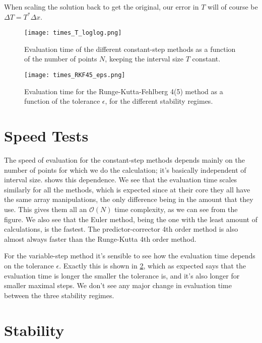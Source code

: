 \documentclass[10pt,a4paper,twocolumn]{article}
\begin{document}
When scaling the solution back to get the original, our error in $T$ will of course be $\Delta T = T^* \Delta x$.

\begin{figure}
    \centering
    \captionsetup{justification=centering}
    \texttt{[image: times\_T\_loglog.png]}
    \caption{Evaluation time of the different constant-step methods as a function of the number of points $N$, keeping the interval size $T$ constant.}
    \label{fig:times_T}
\end{figure}

\begin{figure}
    \centering
    \captionsetup{justification=centering}
    \texttt{[image: times\_RKF45\_eps.png]}
    \caption{Evaluation time for the Runge-Kutta-Fehlberg 4(5) method as a function of the tolerance $\epsilon$, for the different stability regimes.}
    \label{fig:times_RKF45}
\end{figure}

\section{Speed Tests}

The speed of evaluation for the constant-step methods depends mainly on the number of points for which we do the calculation; it's basically independent of interval size.  shows this dependence. We see that the evaluation time scales similarly for all the methods, which is expected since at their core they all have the same array manipulations, the only difference being in the amount that they use. This gives them all an $\mathcal{O}(N)$ time complexity, as we can see from the figure. We also see that the Euler method, being the one with the least amount of calculations, is the fastest. The predictor-corrector 4th order method is also almost always faster than the Runge-Kutta 4th order method.

For the variable-step method it's sensible to see how the evaluation time depends on the tolerance $\epsilon$. Exactly this is shown in \cref{fig:times_RKF45}, which as expected says that the evaluation time is longer the smaller the tolerance is, and it's also longer for smaller maximal steps. We don't see any major change in evaluation time between the three stability regimes.


\section{Stability}
\end{document}
